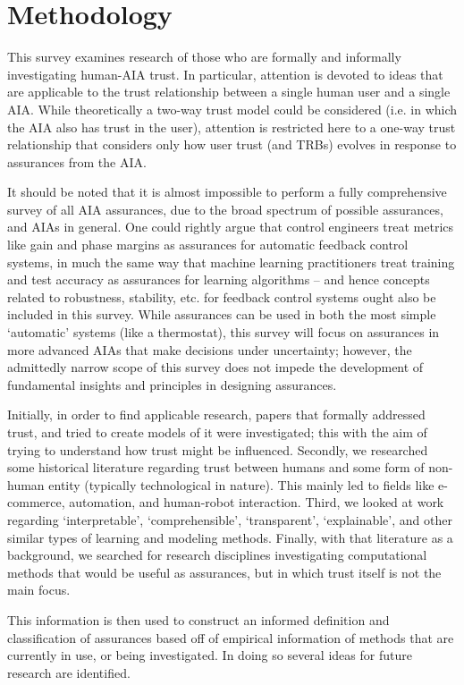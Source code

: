 \section{Methodology} \label{sec:methodology}
    This survey examines research of those who are formally and informally investigating human-AIA trust. In particular, attention is devoted to ideas that are applicable to the trust relationship between a single human user and a single AIA. While theoretically a two-way trust model could be considered (i.e. in which the AIA also has trust in the user), attention is restricted here to a one-way trust relationship that considers only how user trust (and TRBs) evolves in response to assurances from the AIA. 

    It should be noted that it is almost impossible to perform a fully comprehensive survey of all AIA assurances, due to the broad spectrum of possible assurances, and AIAs in general. One could rightly argue that control engineers treat metrics like gain and phase margins as assurances for automatic feedback control systems, in much the same way that  machine learning practitioners treat training and test accuracy as assurances for learning algorithms -- and hence concepts related to robustness, stability, etc. for feedback control systems ought also be included in this survey. While assurances can be used in both the most simple `automatic' systems (like a thermostat), this survey will focus on assurances in more advanced AIAs that make decisions under uncertainty; however, the admittedly narrow scope of this survey does not impede the development of fundamental insights and principles in designing assurances.

    Initially, in order to find applicable research, papers that formally addressed trust, and tried to create models of it were investigated; this with the aim of trying to understand how trust might be influenced. Secondly, we researched some historical literature regarding trust between humans and some form of non-human entity (typically technological in nature). This mainly led to fields like e-commerce, automation, and human-robot interaction. Third, we looked at work regarding `interpretable', `comprehensible', `transparent', `explainable', and other similar types of learning and modeling methods. Finally, with that literature as a background, we searched for research disciplines investigating computational methods that would be useful as assurances, but in which trust itself is not the main focus.

    This information is then used to construct an informed definition and classification of assurances based off of empirical information of methods that are currently in use, or being investigated. In doing so several ideas for future research are identified.

